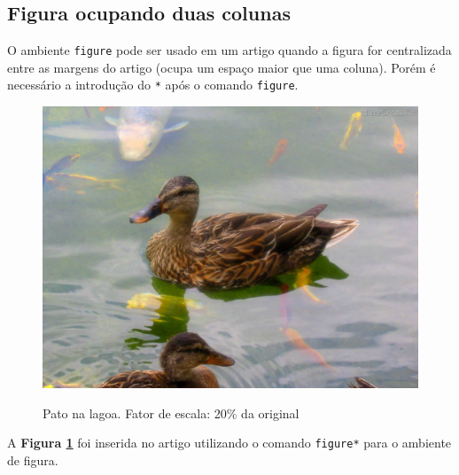 
\subsection{Figura ocupando duas colunas} 		%

O ambiente \verb+figure+ pode ser usado em um artigo quando a figura for centralizada entre as margens do artigo (ocupa um espaço maior que uma coluna). Porém é necessário a introdução do \verb+*+ após o comando \verb+figure+.

\begin{figure}
	\centering
	\caption{Pato na lagoa. Fator de escala: 20\% da original} 
	\includegraphics[scale=0.2]{./02-figuras/pato}
	\label{fig:patoB}
\end{figure}

A \textbf{Figura \ref{fig:patoB}} foi inserida no artigo utilizando o comando \verb+figure*+ para o ambiente de figura.

